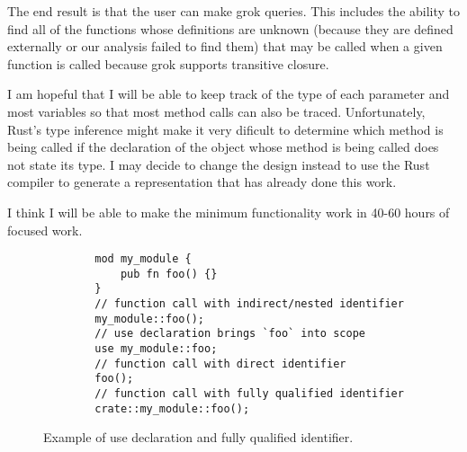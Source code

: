 \documentclass[11pt]{article}
\begin{document}
The end result is that the user can make grok queries.
This includes the ability to find all of the functions whose definitions are unknown (because they are defined externally or our analysis failed to find them) that may be called when a given function is called because grok supports transitive closure.

I am hopeful that I will be able to keep track of the type of each parameter and most variables so that most method calls can also be traced.
Unfortunately, Rust's type inference might make it very dificult to determine which method is being called if the declaration of the object whose method is being called does not state its type.
I may decide to change the design instead to use the Rust compiler to generate a representation that has already done this work.



I think I will be able to make the minimum functionality work in 40-60 hours of focused work.





\begin{figure}
    \caption{Example of use declaration and fully qualified identifier.}
    \label{fig:qualifiers}
    \begin{lstlisting}
        mod my_module {
            pub fn foo() {}
        }
        // function call with indirect/nested identifier
        my_module::foo();
        // use declaration brings `foo` into scope
        use my_module::foo;
        // function call with direct identifier
        foo();
        // function call with fully qualified identifier
        crate::my_module::foo();
    \end{lstlisting}
\end{figure}
\end{document}
